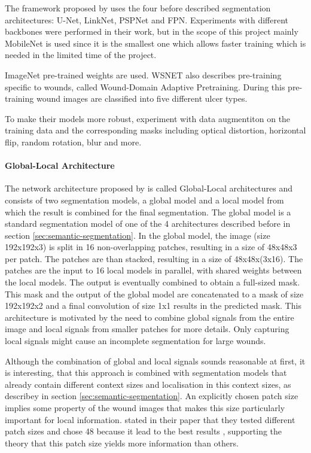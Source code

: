 The framework proposed by \citeauthor{Oota_2023_WACV} uses the four before described segmentation architectures: U-Net, LinkNet, PSPNet and FPN. Experiments with different backbones were performed in their work, but in the scope of this project mainly MobileNet \cite{howard2017mobilenets} is used since it is the smallest one which allows faster training which is needed in the limited time of the project.

ImageNet pre-trained weights are used. WSNET also describes pre-training specific to wounds, called Wound-Domain Adaptive Pretraining. During this pre-training wound images are classified into five different ulcer types.

To make their models more robust, \citeauthor{Oota_2023_WACV} experiment with data augmentiton on the training data and the corresponding masks including optical distortion, horizontal flip, random rotation, blur and more.

\paragraph{Global-Local Architecture}

The network architecture proposed by \citeauthor{Oota_2023_WACV} is called Global-Local architectures and consists of two segmentation models, a global model and a local model from which the result is combined for the final segmentation. The global model is a standard segmentation model of one of the 4 architectures described before in section \ref{sec:semantic-segmentation}. In the global model, the image (size 192x192x3) is split in 16 non-overlapping patches, resulting in a size of 48x48x3 per patch. The patches are than stacked, resulting in a size of 48x48x(3x16). The patches are the input to 16 local models in parallel, with shared weights between the local models. The output is eventually combined to obtain a full-sized mask. This mask and the output of the global model are concatenated to a mask of size 192x192x2 and a final convolution of size 1x1 results in the predicted mask. This architecture is motivated by the need to combine global signals from the entire image and local signals from smaller patches for more details. Only capturing local signals might cause an incomplete segmentation for large wounds. \cite{Oota_2023_WACV} %

Although the combination of global and local signals sounds reasonable at first, it is interesting, that this approach is combined with segmentation models that already contain different context sizes and localisation in this context sizes, as describey in section \ref{sec:semantic-segmentation}. An explicitly chosen patch size implies some property of the wound images that makes this size particularly important for local information. \citeauthor{Oota_2023_WACV} stated in their paper that they tested different patch sizes and chose 48 because it lead to the best results \cite{Oota_2023_WACV}, supporting the theory that this patch size yields more information than others.



